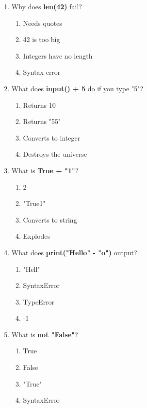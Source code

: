 \documentclass{article}
\begin{document}
\begin{multicols*}{4}
\begin{enumerate}
        \item Why does \textbf{len(42)} fail?
        \begin{enumerate}[label=(\Alph*)]
            \item Needs quotes
            \item 42 is too big
            \item Integers have no length
            \item Syntax error
        \end{enumerate}

        \item What does \textbf{input() + 5} do if you type "5"?
        \begin{enumerate}[label=(\Alph*)]
            \item Returns 10
            \item Returns "55"
            \item Converts to integer
            \item Destroys the universe
        \end{enumerate}

        \item What is \textbf{True + "1"}?
        \begin{enumerate}[label=(\Alph*)]
            \item 2
            \item "True1"
            \item Converts to string
            \item Explodes
        \end{enumerate}

        \item What does \textbf{print("Hello" - "o")} output?
        \begin{enumerate}[label=(\Alph*)]
            \item "Hell"
            \item SyntaxError
            \item TypeError
            \item -1
        \end{enumerate}

        \item What is \textbf{not "False"}?
        \begin{enumerate}[label=(\Alph*)]
            \item True
            \item False
            \item "True"
            \item SyntaxError
        \end{enumerate}


\end{enumerate}
\end{multicols*}
\end{document}
